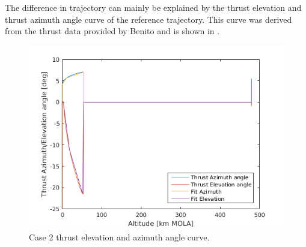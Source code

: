 \noindent
The difference in trajectory can mainly be explained by the thrust elevation and thrust azimuth angle curve of the reference trajectory. This curve was derived from the thrust data provided by Benito and is shown in . 

\begin{figure}[H]
\centering
\includegraphics[width=0.7 \textwidth]{figures/verification/case2/thrustAzimuthAndElevationDerivedFromCase2Version2.png}
\caption{Case 2 thrust elevation and azimuth angle curve.}
\label{fig:thrustAzimuthAndElevationDerivedFromCase2Version2}
\end{figure}


%
%


